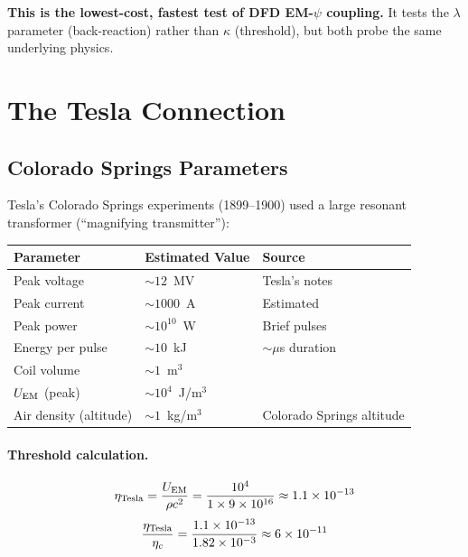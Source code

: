 \documentclass[12pt,a4paper]{article}
\begin{document}
\textbf{This is the lowest-cost, fastest test of DFD EM-$\psi$ coupling.}
It tests the $\lambda$ parameter (back-reaction) rather than $\kappa$ (threshold),
but both probe the same underlying physics.

\section{The Tesla Connection}
\label{sec:tesla}

\subsection{Colorado Springs Parameters}

Tesla's Colorado Springs experiments (1899--1900) used a large resonant
transformer (``magnifying transmitter''):

\begin{center}
\begin{tabular}{lll}
\toprule
Parameter & Estimated Value & Source \\
\midrule
Peak voltage & $\sim 12$~MV & Tesla's notes \\
Peak current & $\sim 1000$~A & Estimated \\
Peak power & $\sim 10^{10}$~W & Brief pulses \\
Energy per pulse & $\sim 10$~kJ & $\sim \mu$s duration \\
Coil volume & $\sim 1$~m$^3$ & \\
$U_{\rm EM}$ (peak) & $\sim 10^4$~J/m$^3$ & \\
Air density (altitude) & $\sim 1$~kg/m$^3$ & Colorado Springs altitude \\
\bottomrule
\end{tabular}
\end{center}

\paragraph{Threshold calculation.}
\begin{equation}
\eta_{\rm Tesla} = \frac{U_{\rm EM}}{\rho c^2} = \frac{10^4}{1 \times 9 \times 10^{16}}
\approx 1.1 \times 10^{-13}
\end{equation}
\begin{equation}
\frac{\eta_{\rm Tesla}}{\eta_c} = \frac{1.1 \times 10^{-13}}{1.82 \times 10^{-3}}
\approx 6 \times 10^{-11}
\end{equation}
\end{document}
